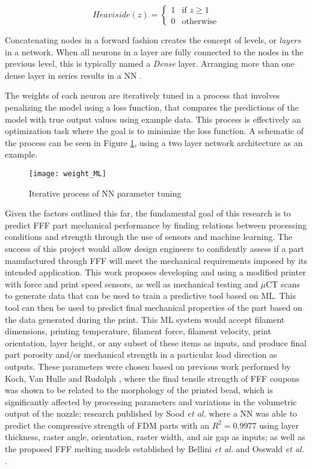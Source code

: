 \documentclass[main.tex]{subfiles}
\begin{document}
\begin{equation} \label{eq:heav}
	Heaviside(z) = \begin{cases}
		1 & \text{if } z \geq 1\\
		0 & \text{otherwise}
	\end{cases}
\end{equation}

Concatenating nodes in a forward fashion creates the concept of levels, or \emph{layers} in a network. When all neurons in a layer are fully connected to the nodes in the previous level, this is typically named a \emph{Dense} layer. Arranging more than one dense layer in series results in a NN \cite{Chollet2018, Geron2019}. 

The weights of each neuron are iteratively tuned in a process that involves penalizing the model using a loss function, that compares the predictions of the model with true output values using example data. This process is effectively an optimization task where the goal is to minimize the loss function. A schematic of the process can be seen in Figure \ref{fig:NN_it}, using a two layer network architecture as an example.

\begin{figure}[!htbp]
	\center
	\texttt{[image: weight\_ML]}
	\caption{Iterative process of NN parameter tuning \cite{Chollet2018}} \label{fig:NN_it}
\end{figure}

Given the factors outlined this far, the fundamental goal of this research is to predict FFF part mechanical performance by finding relations between processing conditions and strength through the use of sensors and machine learning. The success of this project would allow design engineers to confidently assess if a part manufactured through FFF will meet the mechanical requirements imposed by its intended application. This work proposes developing and using a modified printer with force and print speed sensors, as well as mechanical testing and $\mu$CT scans to generate data that can be used to train a predictive tool based on ML. This tool can then be used to predict final mechanical properties of the part based on the data generated during the print. This ML system would accept filament dimensions, printing temperature, filament force, filament velocity, print orientation, layer height, or any subset of these items as inputs, and produce final part porosity and/or mechanical strength in a particular load direction as outputs. These parameters were chosen based on previous work performed by Koch, Van Hulle and Rudolph \cite{Koch2017}, where the final tensile strength of FFF coupons was shown to be related to the morphology of the printed bead, which is significantly affected by processing parameters and variations in the volumetric output of the nozzle; research published by Sood \emph{et al.} \cite{Sood2012} where a NN was able to predict the compressive strength of FDM parts with an $R^2= 0.9977$ using layer thickness, raster angle, orientation, raster width, and air gap as inputs; as well as the proposed FFF melting models established by Bellini \emph{et al.} \cite{Bellini2004} and Osswald \emph{et al.} \cite{OsswaldMelting18}. 
\end{document}
